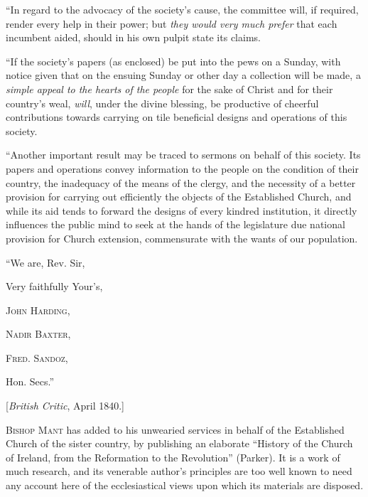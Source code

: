 ``In regard to the advocacy of the society's cause,
the committee will, if required, render every help in their power;
but \emph{they would very much prefer} that each incumbent aided, should
in his own pulpit state its claims.

``If the society's papers (as enclosed) be put into
the pews on a Sunday, with notice given that on the ensuing Sunday or
other day a collection will be made, a \emph{simple appeal to the hearts of
the people} for the sake of Christ and for their country's weal, \emph{will},
under the divine blessing, be productive of cheerful contributions
towards carrying on tile beneficial designs and operations of this
society.

``Another important result may be traced to sermons
on behalf of this society. Its papers and operations convey information
to the people on the condition of their country, the inadequacy of the
means of the clergy, and the necessity of a better provision for
carrying out efficiently the objects of the Established Church, and
while its aid tends to forward the designs of every kindred institution,
it directly influences the public mind to seek at the hands of the
legislature due national provision for Church extension, commensurate
with the wants of our population.

``We are, Rev. Sir,

Very faithfully Your's,

J\textsc{ohn} H\textsc{arding},

N\textsc{adir} B\textsc{axter},

F\textsc{red}. S\textsc{andoz},

Hon. Secs.''


[\emph{British Critic}, April 1840.]

B\textsc{ishop} M\textsc{ant}
has added to his unwearied services in behalf of the Established Church
of the sister country, by publishing an elaborate ``History of the
Church of Ireland, from the Reformation to the Revolution'' (Parker).
It is a work of much research, and its venerable author's principles
are too well known to need any account here of the ecclesiastical views
upon which its materials are disposed.

